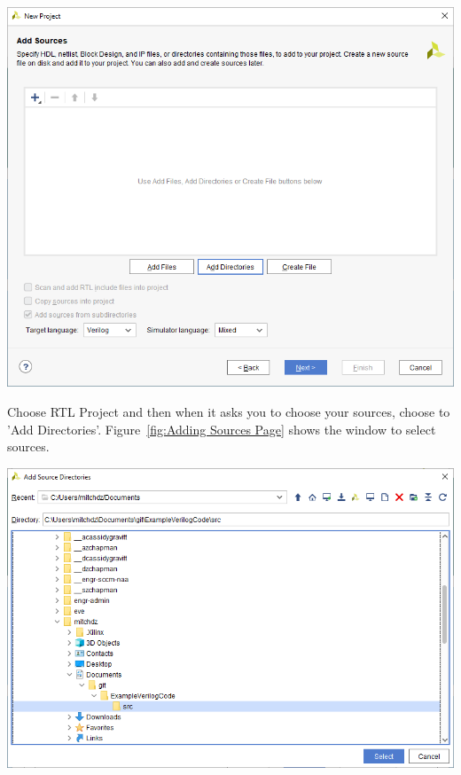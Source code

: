 \documentclass[12pt]{article}
\begin{document}
\begin{center}
    \includegraphics[scale=0.6]{viv_03.PNG}
    \label{fig:Adding Sources Page}
\end{center}

Choose RTL Project and then when it asks you to choose your sources, choose to 'Add Directories'. Figure~\ref{fig:Adding Sources Page} shows the window to select sources.

\begin{center}
    \includegraphics[scale=0.6]{viv_04.PNG}
    \label{fig:Adding Example Code into Vivado}
\end{center}
\end{document}
